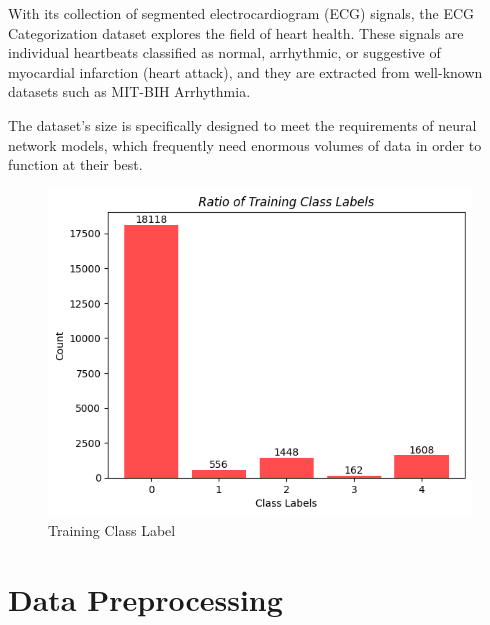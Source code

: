 \documentclass{article}
\begin{document}
With its collection of segmented electrocardiogram (ECG) signals, the ECG Categorization dataset explores the field of heart health. These signals are individual heartbeats classified as normal, arrhythmic, or suggestive of myocardial infarction (heart attack), and they are extracted from well-known datasets such as MIT-BIH Arrhythmia.

The dataset's size is specifically designed to meet the requirements of neural network models, which frequently need enormous volumes of data in order to function at their best.

\begin{figure}[h]
 \centering
 \includegraphics[scale=0.55]{Training Class Label.png} %
 \caption{Training Class Label}
 \label{fig:Training Class Label} %
\end{figure}

\section {Data Preprocessing}
\end{document}
